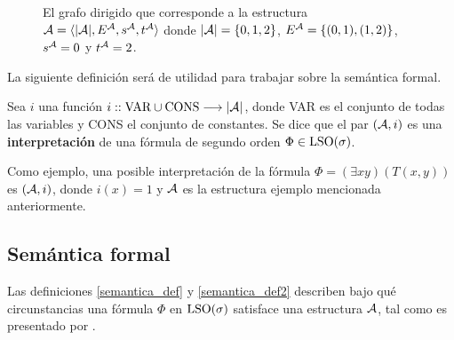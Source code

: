 \begin{figure}[h]
\begin{center}
\end{center}
\caption[Grafo dirigido correspondiente a una estructura \A]{El grafo dirigido que corresponde a la estructura $\mathcal{A}=\langle |\mathcal{A}|,E^{\mathcal{A}},s^{\mathcal{A}},t^{\mathcal{A}} \rangle$
donde $|\mathcal{A}|=\{0,1,2\}$, $E^{\mathcal{A}}=\{(0,1),(1,2)\}$, $s^{\mathcal{A}}=0$ y $t^{\mathcal{A}}=2$.}
\label{grafo_simple}
\end{figure}

La siguiente definición será de utilidad para trabajar sobre la semántica
formal.
\begin{definition}
Sea $i$ una función $i :: \text{VAR} \cup \text{CONS} \longrightarrow |\mathcal{A}|$, donde VAR es el conjunto de
todas las variables y CONS el conjunto de constantes.
Se dice que el par $(\mathcal{A}, i)$ es una \textbf{interpretación} de una fórmula de
segundo orden $\Phi \in \text{LSO}(\sigma)$.
\end{definition}
Como ejemplo, una posible interpretación de la fórmula $\Phi =
(\exists xy) (T(x, y))$
es $(\mathcal{A}, i)$, donde $i(x) = 1$ y $\mathcal{A}$ es la estructura ejemplo mencionada
anteriormente.

\subsection{Semántica formal}
Las definiciones \ref{semantica_def} y \ref{semantica_def2} describen 
bajo qué circunstancias una fórmula $\Phi$ en
$\text{LSO}(\sigma)$ satisface una estructura $\mathcal{A}$, tal como es
presentado por \cite{immerman:book}.


